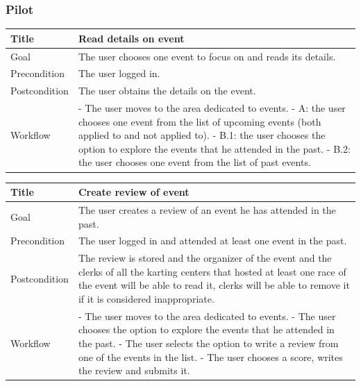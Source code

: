 \documentclass{beamer}
\begin{document}
\begin{frame}
    \frametitle{Pilot}
    \begin{table}
        \tiny
        \begin{tabular}{|p{2cm}|p{6cm}|}
        \hline
        Title & \textbf{Read details on event} \\
        \hline
        Goal & The user chooses one event to focus on and reads its details. \\
        \hline
        Precondition & The user logged in. \\
        \hline
        Postcondition & The user obtains the details on the event. \\
        \hline
        Workflow &
        - The user moves to the area dedicated to events. \newline
        - A: the user chooses one event from the list of upcoming events (both applied to and not applied to). \newline
        - B.1: the user chooses the option to explore the events that he attended in the past. \newline
        - B.2: the user chooses one event from the list of past events. \\
        \hline
        \end{tabular}
    \end{table}

    \begin{table}
        \tiny
        \begin{tabular}{|p{2cm}|p{6cm}|}
        \hline
        Title & \textbf{Create review of event} \\
        \hline
        Goal & The user creates a review of an event he has attended in the past. \\
        \hline
        Precondition & The user logged in and attended at least one event in the past. \\
        \hline
        Postcondition & The review is stored and the organizer of the event and the clerks of all the 
        karting centers that hosted at least one race of the event will be able to read it, clerks will 
        be able to remove it if it is considered inappropriate. \\
        \hline
        Workflow &
        - The user moves to the area dedicated to events. \newline
        - The user chooses the option to explore the events that he attended in the past. \newline
        - The user selects the option to write a review from one of the events in the list. \newline
        - The user chooses a score, writes the review and submits it. \\
        \hline
        \end{tabular}
    \end{table}

\end{frame}
\end{document}
